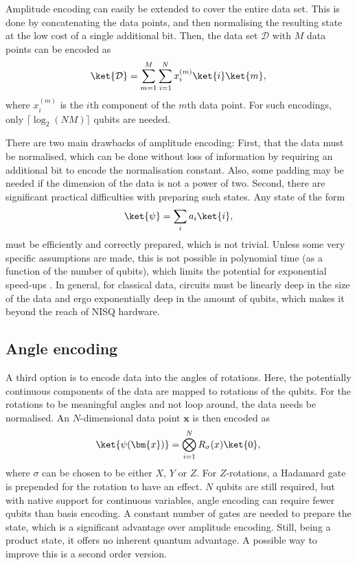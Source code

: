 Amplitude encoding can easily be extended to cover the entire data set.
This is done by concatenating the data points, and then normalising the resulting state at the low cost of a single additional bit.
Then, the data set $\mathcal{D}$ with $M$ data points can be encoded as
\begin{equation}
    \ket{\mathcal{D}} = \sum_{m=1}^M \sum_{i=1}^{N} x_i^{(m)} \ket{i} \ket{m},
\end{equation}
where $x_i^{(m)}$ is the $i$th component of the $m$th data point.
For such encodings, only $\lceil \log_2 (N M) \rceil$ qubits are needed.

There are two main drawbacks of amplitude encoding:
First, that the data must be normalised, which can be done without loss of information by requiring an additional bit to encode the normalisation constant.
Also, some padding may be needed if the dimension of the data is not a power of two.
Second, there are significant practical difficulties with preparing such states.
Any state of the form
\begin{equation}
    \ket{\psi} = \sum_{i} a_i \ket{i},
\end{equation}
must be efficiently and correctly prepared, which is not trivial.
Unless some very specific assumptions are made, this is not possible in polynomial time (as a function of the number of qubits), which limits the potential for exponential speed-ups \cite{schuld2018}.
In general, for classical data, circuits must be linearly deep in the size of the data and ergo exponentially deep in the amount of qubits, which makes it beyond the reach of NISQ hardware.

\subsection{Angle encoding}
A third option is to encode data into the angles of rotations.
Here, the potentially continuous components of the data are mapped to rotations of the qubits.
For the rotations to be meaningful angles and not loop around, the data needs be normalised.
An $N$-dimensional data point $\bm{x}$ is then encoded as
\begin{equation}
    \ket{\psi(\bm{x})} = \bigotimes_{i=1}^{N} R_\sigma(x) \ket{0},
\end{equation}
where $\sigma$ can be chosen to be either $X$, $Y$ or $Z$.
For $Z$-rotations, a Hadamard gate is prepended for the rotation to have an effect.
$N$ qubits are still required, but with native support for continuous variables, angle encoding can require fewer qubits than basis encoding.
A constant number of gates are needed to prepare the state, which is a significant advantage over amplitude encoding.
Still, being a product state, it offers no inherent quantum advantage.
A possible way to improve this is a second order version.

